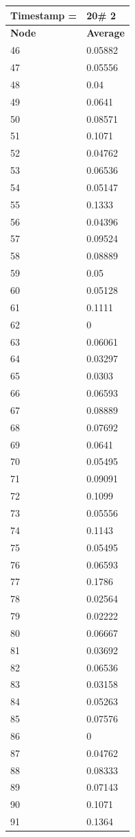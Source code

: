 \begin{tabular}{|l||l|}
\hline
\textbf{Timestamp =} & \textbf{20}\# 2\\\hline
	\textbf{Node} & \textbf{Average} \\ \hline
\hline
	46 & 0.05882 \\ \hline
	47 & 0.05556 \\ \hline
	48 & 0.04 \\ \hline
	49 & 0.0641 \\ \hline
	50 & 0.08571 \\ \hline
	51 & 0.1071 \\ \hline
	52 & 0.04762 \\ \hline
	53 & 0.06536 \\ \hline
	54 & 0.05147 \\ \hline
	55 & 0.1333 \\ \hline
	56 & 0.04396 \\ \hline
	57 & 0.09524 \\ \hline
	58 & 0.08889 \\ \hline
	59 & 0.05 \\ \hline
	60 & 0.05128 \\ \hline
	61 & 0.1111 \\ \hline
	62 & 0 \\ \hline
	63 & 0.06061 \\ \hline
	64 & 0.03297 \\ \hline
	65 & 0.0303 \\ \hline
	66 & 0.06593 \\ \hline
	67 & 0.08889 \\ \hline
	68 & 0.07692 \\ \hline
	69 & 0.0641 \\ \hline
	70 & 0.05495 \\ \hline
	71 & 0.09091 \\ \hline
	72 & 0.1099 \\ \hline
	73 & 0.05556 \\ \hline
	74 & 0.1143 \\ \hline
	75 & 0.05495 \\ \hline
	76 & 0.06593 \\ \hline
	77 & 0.1786 \\ \hline
	78 & 0.02564 \\ \hline
	79 & 0.02222 \\ \hline
	80 & 0.06667 \\ \hline
	81 & 0.03692 \\ \hline
	82 & 0.06536 \\ \hline
	83 & 0.03158 \\ \hline
	84 & 0.05263 \\ \hline
	85 & 0.07576 \\ \hline
	86 & 0 \\ \hline
	87 & 0.04762 \\ \hline
	88 & 0.08333 \\ \hline
	89 & 0.07143 \\ \hline
	90 & 0.1071 \\ \hline
	91 & 0.1364 \\ \hline
\end{tabular}
